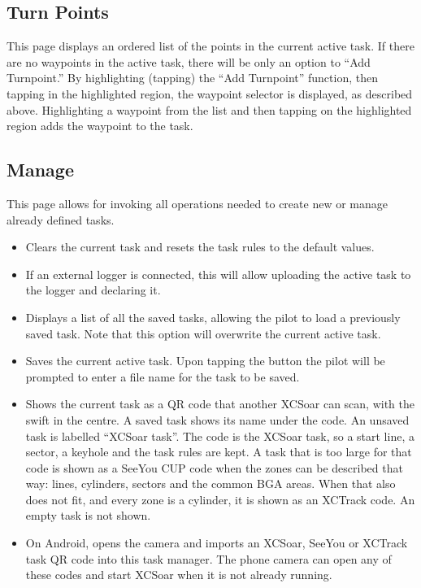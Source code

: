 \subsection*{Turn Points}
This page displays an ordered list of the points in the current active task.
If there are no waypoints in the active task, there
will be only an option to ``Add Turnpoint.''  By highlighting (tapping) the
``Add Turnpoint'' function, then tapping in the highlighted region, the waypoint
selector is displayed, as described above.  Highlighting a waypoint from the
list and then tapping on the highlighted region adds the waypoint to the task.

\subsection*{Manage}
This page allows for invoking all operations needed to create new or manage
already defined tasks.


\begin{itemize}
\item [\bmenuw{New Task}] Clears the current task and resets the task rules to
  the default values.
\item [\bmenuw{Declare}] If an external logger is connected, this will allow
  uploading the  active task to the logger and declaring it.
\item [\bmenuw{Browse}] Displays a list of all the saved tasks, allowing the
  pilot to load a previously saved task.  Note that this option will overwrite
  the current active task.
\item [\bmenuw{Save}] Saves the current active task.  Upon tapping the
   button the pilot will be prompted to enter a file name for the
  task to be saved.
\item [\bmenuw{Show QR Code}] Shows the current task as a QR code that
  another XCSoar can scan, with the swift in the centre.  A saved
  task shows its name under the code.  An unsaved task is labelled
  ``XCSoar task''.  The code is the XCSoar task, so a start line, a
  sector, a keyhole and the task rules are kept.  A task that is too
  large for that code is shown as a SeeYou CUP code when the zones
  can be described that way: lines, cylinders, sectors and the
  common BGA areas.  When that also does not fit, and every zone is a
  cylinder, it is shown as an XCTrack code.  An empty task is not
  shown.
\item [\bmenuw{Scan QR Code}] On Android, opens the camera and imports
  an XCSoar, SeeYou or XCTrack task QR code into this task manager.
  The phone camera can open any of these codes and start XCSoar when
  it is not already running.
\end{itemize}

